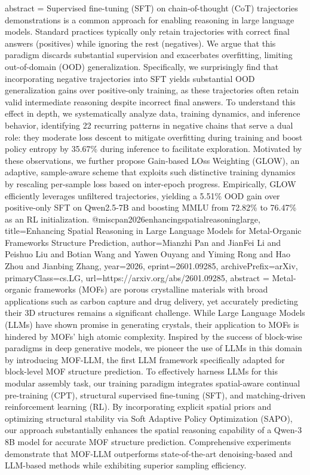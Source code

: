 {      abstract = {Supervised fine-tuning (SFT) on chain-of-thought (CoT) trajectories demonstrations is a common approach for enabling reasoning in large language models. Standard practices typically only retain trajectories with correct final answers (positives) while ignoring the rest (negatives). We argue that this paradigm discards substantial supervision and exacerbates overfitting, limiting out-of-domain (OOD) generalization. Specifically, we surprisingly find that incorporating negative trajectories into SFT yields substantial OOD generalization gains over positive-only training, as these trajectories often retain valid intermediate reasoning despite incorrect final answers. To understand this effect in depth, we systematically analyze data, training dynamics, and inference behavior, identifying 22 recurring patterns in negative chains that serve a dual role: they moderate loss descent to mitigate overfitting during training and boost policy entropy by 35.67\% during inference to facilitate exploration. Motivated by these observations, we further propose Gain-based LOss Weighting (GLOW), an adaptive, sample-aware scheme that exploits such distinctive training dynamics by rescaling per-sample loss based on inter-epoch progress. Empirically, GLOW efficiently leverages unfiltered trajectories, yielding a 5.51\% OOD gain over positive-only SFT on Qwen2.5-7B and boosting MMLU from 72.82\% to 76.47\% as an RL initialization.}
}@misc{pan2026enhancingspatialreasoninglarge,
      title={Enhancing Spatial Reasoning in Large Language Models for Metal-Organic Frameworks Structure Prediction}, 
      author={Mianzhi Pan and JianFei Li and Peishuo Liu and Botian Wang and Yawen Ouyang and Yiming Rong and Hao Zhou and Jianbing Zhang},
      year={2026},
      eprint={2601.09285},
      archivePrefix={arXiv},
      primaryClass={cs.LG},
      url={https://arxiv.org/abs/2601.09285},
      abstract = {Metal-organic frameworks (MOFs) are porous crystalline materials with broad applications such as carbon capture and drug delivery, yet accurately predicting their 3D structures remains a significant challenge. While Large Language Models (LLMs) have shown promise in generating crystals, their application to MOFs is hindered by MOFs' high atomic complexity. Inspired by the success of block-wise paradigms in deep generative models, we pioneer the use of LLMs in this domain by introducing MOF-LLM, the first LLM framework specifically adapted for block-level MOF structure prediction. To effectively harness LLMs for this modular assembly task, our training paradigm integrates spatial-aware continual pre-training (CPT), structural supervised fine-tuning (SFT), and matching-driven reinforcement learning (RL). By incorporating explicit spatial priors and optimizing structural stability via Soft Adaptive Policy Optimization (SAPO), our approach substantially enhances the spatial reasoning capability of a Qwen-3 8B model for accurate MOF structure prediction. Comprehensive experiments demonstrate that MOF-LLM outperforms state-of-the-art denoising-based and LLM-based methods while exhibiting superior sampling efficiency.}
}
